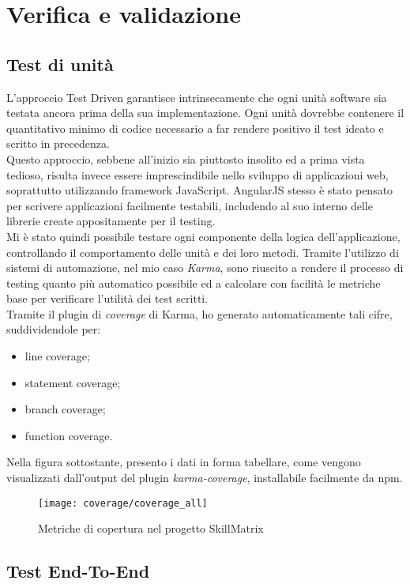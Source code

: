 
\chapter{Verifica e validazione}
\label{cap:verifica-validazione}

\section{Test di unità}
L'approccio Test Driven garantisce intrinsecamente che ogni unità software sia testata ancora prima della sua implementazione. Ogni unità dovrebbe contenere il quantitativo minimo di codice necessario a far rendere positivo il test ideato e scritto in precedenza.\\
Questo approccio, sebbene all'inizio sia piuttosto insolito ed a prima vista tedioso, risulta invece essere imprescindibile nello sviluppo di applicazioni web, soprattutto utilizzando framework JavaScript. AngularJS stesso è stato pensato per scrivere applicazioni facilmente testabili, includendo al suo interno delle librerie create appositamente per il testing.\\
Mi è stato quindi possibile testare ogni componente della logica dell'applicazione, controllando il comportamento delle unità e dei loro metodi. Tramite l'utilizzo di sistemi di automazione, nel mio caso \emph{Karma}, sono riuscito a rendere il processo di testing quanto più automatico possibile ed a calcolare con facilità le metriche base per verificare l'utilità dei test scritti.\\
Tramite il plugin di \emph{coverage} di Karma, ho generato automaticamente tali cifre, suddividendole per:
\begin{itemize}
	\item line coverage;
	\item statement coverage;
	\item branch coverage;
	\item function coverage.
\end{itemize}
Nella figura sottostante, presento i dati in forma tabellare, come vengono visualizzati dall'output del plugin \emph{karma-coverage}, installabile facilmente da \gls{npm}.

\begin{figure}[H] 
    \centering 
    \texttt{[image: coverage/coverage\_all]} 
    \caption{Metriche di copertura nel progetto SkillMatrix}
\end{figure}

\section{Test End-To-End}